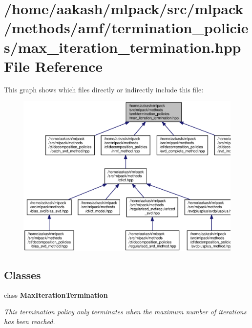 \section{/home/aakash/mlpack/src/mlpack/methods/amf/termination\+\_\+policies/max\+\_\+iteration\+\_\+termination.hpp File Reference}
\label{max__iteration__termination_8hpp}
This graph shows which files directly or indirectly include this file\+:
\nopagebreak
\begin{figure}[H]
\begin{center}
\leavevmode
\includegraphics[width=350pt]{max__iteration__termination_8hpp__dep__incl}
\end{center}
\end{figure}
\subsection*{Classes}
\begin{DoxyCompactItemize}
\item 
class \textbf{ Max\+Iteration\+Termination}
\begin{DoxyCompactList}\small\item\em This termination policy only terminates when the maximum number of iterations has been reached. \end{DoxyCompactList}\end{DoxyCompactItemize}
